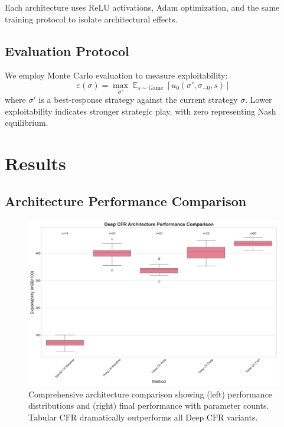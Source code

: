 \documentclass{article}
\DeclareMathOperator{\E}{\mathbb{E}}
\begin{document}
Each architecture uses ReLU activations, Adam optimization, and the same training protocol to isolate architectural effects.

\subsection{Evaluation Protocol}

We employ Monte Carlo evaluation to measure exploitability:
\[
\varepsilon(\sigma) = \max_{\sigma'} \E_{s \sim \text{Game}}[u_0(\sigma', \sigma_{-0}, s)]
\]
where $\sigma'$ is a best-response strategy against the current strategy $\sigma$. Lower exploitability indicates stronger strategic play, with zero representing Nash equilibrium.

\section{Results}

\subsection{Architecture Performance Comparison}

\begin{figure}[t]
\centering
\includegraphics[width=\textwidth]{plots/performance_comparison}
\caption{Comprehensive architecture comparison showing (left) performance distributions and (right) final performance with parameter counts. Tabular CFR dramatically outperforms all Deep CFR variants.}
\label{fig:architecture_results}
\end{figure}
\end{document}
